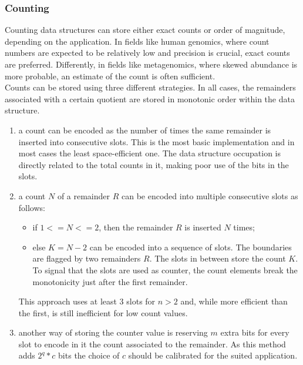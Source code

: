 \subsubsection*{Counting}
\label{sec:rsqfcount}
Counting data structures can store either exact counts or order of magnitude, depending on the application. In fields like human genomics, where count numbers are expected to be relatively low and precision is crucial, exact counts are preferred. Differently, in fields like metagenomics, where skewed abundance is more probable, an estimate of the count is often sufficient.\\
Counts can be stored using three different strategies. In all cases, the remainders associated with a certain quotient are stored in monotonic order within the data structure.
\begin{enumerate}
	\item  a count can be encoded as the number of times the same remainder is inserted into consecutive slots. This is the most basic implementation and in most cases the least space-efficient one. The data structure occupation is directly related to the total counts in it, making poor use of the bits in the slots.
	\item a count $N$ of a remainder $R$ can be encoded into multiple consecutive slots as follows: 
	\begin{itemize}
		\item if $1 <= N <= 2$, then the remainder $R$ is inserted $N$ times;
		\item else $K = N - 2$ can be encoded into a sequence of slots. The boundaries are flagged by two remainders $R$. The slots in between store the count $K$. To signal that the slots are used as counter, the count elements break the monotonicity just after the first remainder.
	\end{itemize}
	This approach uses at least 3 slots for $n>2$ and, while more efficient than the first, is still inefficient for low count values.
	\item another way of storing the counter value is reserving $m$ extra bits for every slot to encode in it the count associated to the remainder. As this method adds $2^q * c$ bits the choice of $c$ should be calibrated for the suited application. 
\end{enumerate}

